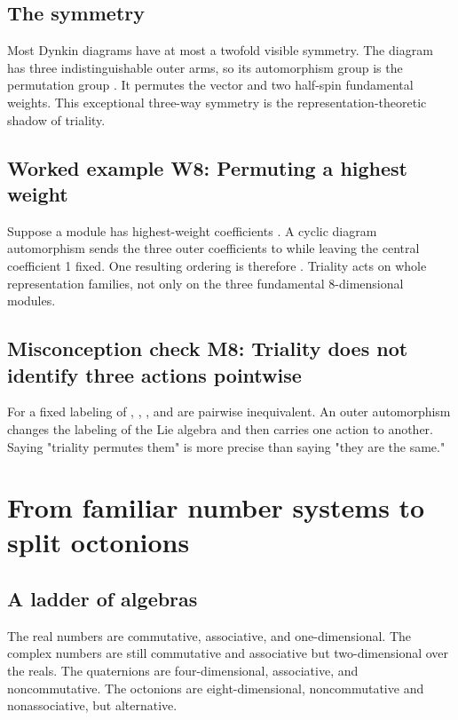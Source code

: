 \documentclass[11pt]{article}
\begin{document}
\subsection{The \texttt{} symmetry}

Most Dynkin diagrams have at most a twofold visible symmetry. The \texttt{} diagram has three indistinguishable outer arms, so its automorphism group is the permutation group \texttt{}. It permutes the vector and two half-spin fundamental weights. This exceptional three-way symmetry is the representation-theoretic shadow of triality.

\subsection{Worked example W8: Permuting a highest weight}

Suppose a module has highest-weight coefficients \texttt{}. A cyclic diagram automorphism sends the three outer coefficients \texttt{} to \texttt{} while leaving the central coefficient 1 fixed. One resulting ordering is therefore \texttt{}. Triality acts on whole representation families, not only on the three fundamental 8-dimensional modules.

\subsection{Misconception check M8: Triality does not identify three actions pointwise}

For a fixed labeling of \texttt{}, \texttt{}, \texttt{}, and \texttt{} are pairwise inequivalent. An outer automorphism changes the labeling of the Lie algebra and then carries one action to another. Saying "triality permutes them" is more precise than saying "they are the same."

\section{From familiar number systems to split octonions}

\subsection{A ladder of algebras}

The real numbers are commutative, associative, and one-dimensional. The complex numbers are still commutative and associative but two-dimensional over the reals. The quaternions are four-dimensional, associative, and noncommutative. The octonions are eight-dimensional, noncommutative and nonassociative, but alternative.
\end{document}
